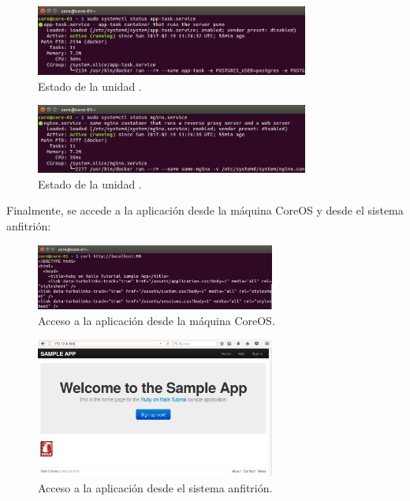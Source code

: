 \begin{figure}[H]
\centering
\includegraphics[width=0.8\textwidth]{images/figures/app-task.service.png}
\caption{Estado de la unidad .}
\end{figure}

\begin{figure}[H]
\centering
\includegraphics[width=0.8\textwidth]{images/figures/nginx.service.png}
\caption{Estado de la unidad .}
\end{figure}

Finalmente, se accede a la aplicación desde la máquina CoreOS y desde el sistema anfitrión:

\begin{figure}[H]
\centering
\includegraphics[width=0.7\textwidth]{images/figures/coreosmanualcurl.png}
\caption{Acceso a la aplicación desde la máquina CoreOS.}
\end{figure}

\begin{figure}[H]
\centering
\includegraphics[width=0.7\textwidth]{images/figures/coreosmanualhost.png}
\caption{Acceso a la aplicación desde el sistema anfitrión.}
\end{figure}


